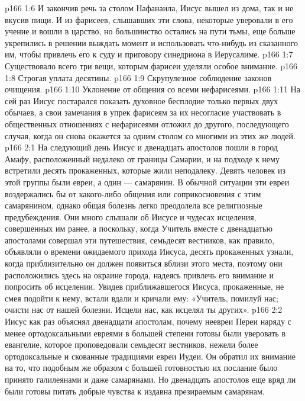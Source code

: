 \vs p166 1:6 И закончив речь за столом Нафанаила, Иисус вышел из дома, так и не вкусив пищи. И из фарисеев, слышавших эти слова, некоторые уверовали в его учение и вошли в царство, но большинство остались на пути тьмы, еще больше укрепились в решении выждать момент и использовать что\hyp{}нибудь из сказанного им, чтобы привлечь его к суду и приговору синедриона в Иерусалиме.
\vs p166 1:7 \pc Существовало всего три вещи, которым фарисеи уделяли особое внимание.
\vs p166 1:8 \bibnobreakspace Строгая уплата десятины.
\vs p166 1:9 \bibnobreakspace Скрупулезное соблюдение законов очищения.
\vs p166 1:10 \bibnobreakspace Уклонение от общения со всеми нефарисеями.
\vs p166 1:11 \pc На сей раз Иисус постарался показать духовное бесплодие только первых двух обычаев, а свои замечания в упрек фарисеям за их несогласие участвовать в общественных отношениях с нефарисеями отложил до другого, последующего случая, когда он снова окажется за одним столом со многими из этих же людей.
\vs p166 2:1 На следующий день Иисус и двенадцать апостолов пошли в город Амафу, расположенный недалеко от границы Самарии, и на подходе к нему встретили десять прокаженных, которые жили неподалеку. Девять человек из этой группы были евреи, а один --- самарянин. В обычной ситуации эти евреи воздержались бы от какого\hyp{}либо общения или соприкосновения с этим самарянином, однако общая болезнь легко преодолела все религиозные предубеждения. Они много слышали об Иисусе и чудесах исцеления, совершенных им ранее, а поскольку, когда Учитель вместе с двенадцатью апостолами совершал эти путешествия, семьдесят вестников, как правило, объявляли о времени ожидаемого прихода Иисуса, десять прокаженных узнали, когда приблизительно он должен появиться вблизи этого места, поэтому они расположились здесь на окраине города, надеясь привлечь его внимание и попросить об исцелении. Увидев приближавшегося Иисуса, прокаженные, не смея подойти к нему, встали вдали и кричали ему: «Учитель, помилуй нас; очисти нас от нашей болезни. Исцели нас, как исцелял ты других».
\vs p166 2:2 Иисус как раз объяснял двенадцати апостолам, почему неевреи Переи наряду с менее ортодоксальными евреями в большей степени готовы были уверовать в евангелие, которое проповедовали семьдесят вестников, нежели более ортодоксальные и скованные традициями евреи Иудеи. Он обратил их внимание на то, что подобным же образом с большей готовностью их послание было принято галилеянами и даже самарянами. Но двенадцать апостолов еще вряд ли были готовы питать добрые чувства к издавна презираемым самарянам.
